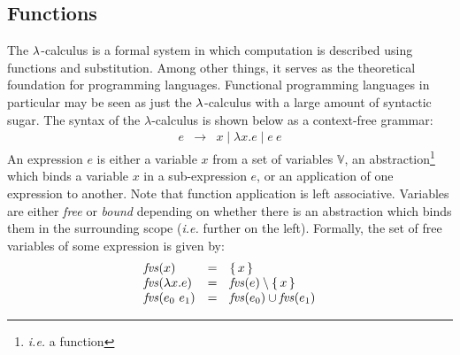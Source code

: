 \documentclass[10pt,a4paper]{exam}
\begin{document}
\begin{questions}
\section*{Functions}

\question The $\color{black}\lambda$-calculus is a formal system in which computation is described using functions and substitution. Among other things, it serves as the theoretical foundation for programming languages. Functional programming languages in particular may be seen as just the $\color{black}\lambda$-calculus with a large amount of syntactic sugar. The syntax of the $\lambda$-calculus is shown below as a context-free grammar:
\begin{displaymath}
\begin{array}{lcl}
e & \to & x \mid \lambda x.e \mid e~e
\end{array}
\end{displaymath} 
An expression $e$ is either a variable $x$ from a set of variables $\mathbb{V}$, an abstraction\footnote{\emph{i.e.} a function} which binds a variable $x$ in a sub-expression $e$, or an application of one expression to another. Note that function application is left associative. Variables are either \emph{free} or \emph{bound} depending on whether there is an abstraction which binds them in the surrounding scope (\emph{i.e.} further on the left). Formally, the set of free variables of some expression is given by: 
\begin{displaymath}
\begin{array}{lcl}
\mathit{fvs}(x) & = & \{\,x\,\} \\
\mathit{fvs}(\lambda x.e) & = & \mathit{fvs}(e) \setminus \{\,x\,\} \\
\mathit{fvs}(e_0~e_1) & = & \mathit{fvs}(e_0) \cup \mathit{fvs}(e_1)
\end{array}
\end{displaymath}
\end{questions}
\end{document}
